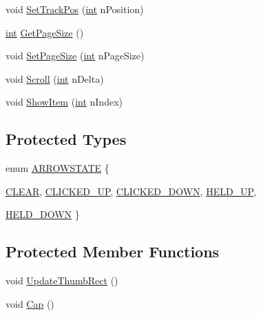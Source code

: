 \begin{DoxyCompactItemize}
void \hyperlink{class_c_d_x_u_t_scroll_bar_af38e14cfcc0d51d1c3238b3ed1d21553}{SetTrackPos} (\hyperlink{_d_x_u_tgui_8cpp_a2d77ed03302b6978834ee3b6f57837fb}{int} nPosition)
\item 
\hyperlink{_d_x_u_tgui_8cpp_a2d77ed03302b6978834ee3b6f57837fb}{int} \hyperlink{class_c_d_x_u_t_scroll_bar_aa345a24d104acd194af1c637bb386fc3}{GetPageSize} ()
\item 
void \hyperlink{class_c_d_x_u_t_scroll_bar_ad59e8080c3af65a712c725d8cb4f1a10}{SetPageSize} (\hyperlink{_d_x_u_tgui_8cpp_a2d77ed03302b6978834ee3b6f57837fb}{int} nPageSize)
\item 
void \hyperlink{class_c_d_x_u_t_scroll_bar_ae0f76bd7f88a7f26fce6b6026c686245}{Scroll} (\hyperlink{_d_x_u_tgui_8cpp_a2d77ed03302b6978834ee3b6f57837fb}{int} nDelta)
\item 
void \hyperlink{class_c_d_x_u_t_scroll_bar_ae7cbe7407c725caf9f57ee95a3e633ca}{ShowItem} (\hyperlink{_d_x_u_tgui_8cpp_a2d77ed03302b6978834ee3b6f57837fb}{int} nIndex)
\end{DoxyCompactItemize}
\subsection*{Protected Types}
\begin{DoxyCompactItemize}
\item 
enum \hyperlink{class_c_d_x_u_t_scroll_bar_a43b1ef354a17195db720617bf6b34595}{ARROWSTATE} \{ \par
\hyperlink{class_c_d_x_u_t_scroll_bar_a43b1ef354a17195db720617bf6b34595a58ecc240070da4e972c23f1cd0deee7c}{CLEAR}, 
\hyperlink{class_c_d_x_u_t_scroll_bar_a43b1ef354a17195db720617bf6b34595a376838d4568537d54ac440758d4361e5}{CLICKED\_\-UP}, 
\hyperlink{class_c_d_x_u_t_scroll_bar_a43b1ef354a17195db720617bf6b34595a301225074fcc3266420019c1f541bfd3}{CLICKED\_\-DOWN}, 
\hyperlink{class_c_d_x_u_t_scroll_bar_a43b1ef354a17195db720617bf6b34595a3b7008371084d0e81d4dab21cb8669d7}{HELD\_\-UP}, 
\par
\hyperlink{class_c_d_x_u_t_scroll_bar_a43b1ef354a17195db720617bf6b34595ae1d90e180e124651da98fd39f25f65c0}{HELD\_\-DOWN}
 \}
\end{DoxyCompactItemize}
\subsection*{Protected Member Functions}
\begin{DoxyCompactItemize}
\item 
void \hyperlink{class_c_d_x_u_t_scroll_bar_aab1de864a32b8813b814a67cc232eeed}{UpdateThumbRect} ()
\item 
void \hyperlink{class_c_d_x_u_t_scroll_bar_a2a680f2ce9c5fa971ccc9b618de9e8fa}{Cap} ()
\end{DoxyCompactItemize}
